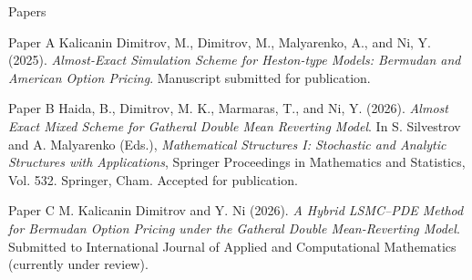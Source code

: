 \begin{frame}
  \titlepage
\end{frame}

\begin{frame}{Papers}
  \vspace{-0.25em}
  {\fontsize{7.9}{9.1}\selectfont
  \begin{block}{Paper A}
    Kalicanin Dimitrov, M., Dimitrov, M., Malyarenko, A., and Ni, Y. (2025).
    \emph{Almost-Exact Simulation Scheme for Heston-type Models: Bermudan and American Option Pricing}.
    Manuscript submitted for publication.
  \end{block}

  \vspace{-0.1em}
  \begin{block}{Paper B}
    Haida, B., Dimitrov, M. K., Marmaras, T., and Ni, Y. (2026).
    \emph{Almost Exact Mixed Scheme for Gatheral Double Mean Reverting Model}.
    In S. Silvestrov and A. Malyarenko (Eds.),
    \emph{Mathematical Structures I: Stochastic and Analytic Structures with Applications},
    Springer Proceedings in Mathematics and Statistics, Vol. 532. Springer, Cham.
    Accepted for publication.
  \end{block}

  \vspace{-0.1em}
  \begin{block}{Paper C}
    M. Kalicanin Dimitrov and Y. Ni (2026).
    \emph{A Hybrid LSMC--PDE Method for Bermudan Option Pricing under the Gatheral Double Mean-Reverting Model}.
    Submitted to International Journal of Applied and Computational Mathematics (currently under review).
  \end{block}}
\end{frame}

